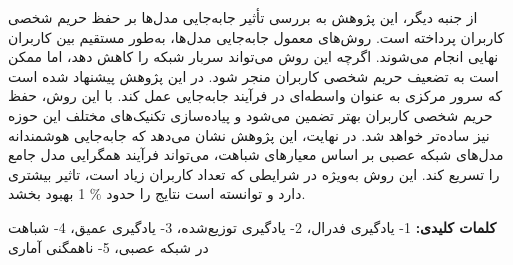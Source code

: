 \begin{small}
از جنبه دیگر، این پژوهش به بررسی تأثیر جابه‌جایی مدل‌ها بر حفظ حریم شخصی کاربران پرداخته است. روش‌های معمول جابه‌جایی مدل‌ها، به‌طور مستقیم بین کاربران نهایی انجام می‌شوند. اگرچه این روش می‌تواند سربار شبکه را کاهش دهد، اما ممکن است به تضعیف حریم شخصی کاربران منجر شود. در این پژوهش پیشنهاد شده است که سرور مرکزی به عنوان واسطه‌ای در فرآیند جابه‌جایی عمل کند. با این روش، حفظ حریم شخصی کاربران بهتر تضمین می‌شود و پیاده‌سازی تکنیک‌های مختلف این حوزه نیز ساده‌تر خواهد شد.
در نهایت، این پژوهش نشان می‌دهد که جابه‌جایی هوشمندانه مدل‌های شبکه عصبی بر اساس معیارهای شباهت، می‌تواند فرآیند همگرایی مدل جامع را تسریع کند. این روش به‌ویژه در شرایطی که تعداد کاربران زیاد است، تاثیر بیشتری دارد و توانسته است نتایج را حدود
{\footnotesize \(\%\)}%
1 بهبود بخشد.



\vspace{5mm}
\noindent\textbf{کلمات کلیدی:}
1- یادگیری فدرال،
2- یادگیری توزیع‌شده،
3- یادگیری عمیق،
4- شباهت در شبکه عصبی،
5- ناهمگنی آماری
\end{small}